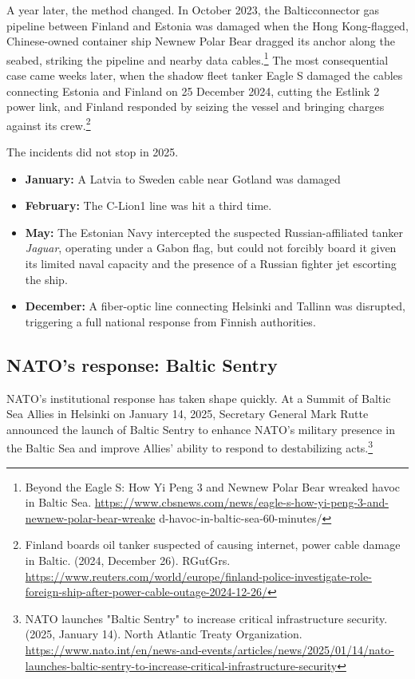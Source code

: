 A year later, the method changed. In October 2023, the Balticconnector gas pipeline between Finland and Estonia was damaged when the Hong Kong-flagged, Chinese-owned container ship Newnew Polar Bear dragged its anchor along the seabed, striking the pipeline and nearby data cables.\footnote{Beyond the Eagle S: How Yi Peng 3 and Newnew Polar Bear wreaked havoc in Baltic Sea. \url{https://www.cbsnews.com/news/eagle-s-how-yi-peng-3-and-newnew-polar-bear-wreake} d-havoc-in-baltic-sea-60-minutes/} The most consequential case came weeks later, when the shadow fleet tanker Eagle S damaged the cables connecting Estonia and Finland on 25 December 2024, cutting the Estlink 2 power link, and Finland responded by seizing the vessel and bringing charges against its crew.\footnote{Finland boards oil tanker suspected of causing internet, power cable damage in Baltic. (2024, December 26). RGuťGrs. \url{https://www.reuters.com/world/europe/finland-police-investigate-role-foreign-ship-after-power-cable-outage-2024-12-26/}}

The incidents did not stop in 2025.

\begin{itemize}
  \item \textbf{January:} A Latvia to Sweden cable near Gotland was damaged
  \item \textbf{February:} The C-Lion1 line was hit a third time.
  \item \textbf{May:} The Estonian Navy intercepted the suspected Russian-affiliated tanker \emph{Jaguar}, operating under a Gabon flag, but could not forcibly board it given its limited naval capacity and the presence of a Russian fighter jet escorting the ship.
  \item \textbf{December:} A fiber-optic line connecting Helsinki and Tallinn was disrupted, triggering a full national response from Finnish authorities.
\end{itemize}

\subsection{NATO’s response: Baltic Sentry}

NATO's institutional response has taken shape quickly. At a Summit of Baltic Sea Allies in Helsinki on January 14, 2025, Secretary General Mark Rutte announced the launch of Baltic Sentry to enhance NATO's military presence in the Baltic Sea and improve Allies' ability to respond to destabilizing acts.\footnote{NATO launches "Baltic Sentry" to increase critical infrastructure security. (2025, January 14). North Atlantic Treaty Organization. \url{https://www.nato.int/en/news-and-events/articles/news/2025/01/14/nato-launches-baltic-sentry-to-increase-critical-infrastructure-security}}

